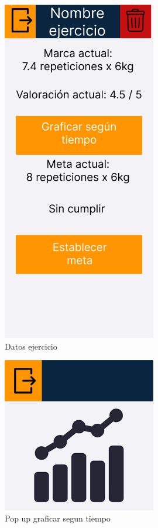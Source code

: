 \begin{figure}[H]
   \centering
    \includegraphics[width=0.6\textwidth]{fotos/Frame 42.png}
    \caption{Datos ejercicio}
    \label{fig:Datos ejercicio}
\end{figure}
\begin{figure}[H]
   \centering
    \includegraphics[width=0.6\textwidth]{fotos/Frame 43.png}
    \caption{Pop up graficar segun tiempo}
    \label{fig:Pop up graficar segun tiempo}
\end{figure}
